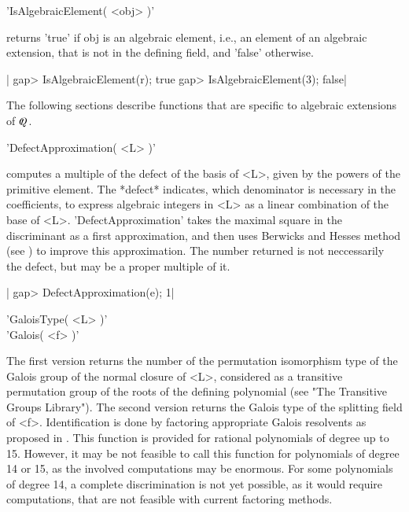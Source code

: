 
'IsAlgebraicElement( <obj> )'

returns 'true' if obj is an algebraic element, i.e., an element of an
algebraic extension, that is not in the defining field, and 'false'
otherwise.

|    gap> IsAlgebraicElement(r);
    true
    gap> IsAlgebraicElement(3);
    false|


The following sections describe functions that are specific to algebraic
extensions of ${Q\mskip-11mu\prime\,\,}$.


'DefectApproximation( <L> )'

computes a multiple of the defect of the basis of <L>, given by the
powers of the primitive element.  The *defect* indicates, which
denominator is necessary in the coefficients, to express algebraic
integers in <L> as a linear combination of the base of <L>.
'DefectApproximation' takes the maximal square in the discriminant as a
first approximation, and then uses Berwicks and Hesses method (see
\cite{Bra89}) to improve this approximation.  The number returned is not
neccessarily the defect, but may be a proper multiple of it.

|    gap> DefectApproximation(e);
    1|


'GaloisType( <L> )' \\
'Galois( <f> )'

The first version returns the number of the permutation isomorphism type
of the Galois group of the normal closure of <L>, considered as a
transitive permutation group of the roots of the defining polynomial (see
"The Transitive Groups Library").  The second version returns the Galois
type of the splitting field of <f>.  Identification is done by factoring
appropriate Galois resolvents as proposed in \cite{MS85}.  This function
is provided for rational polynomials of degree up to 15.  However, it may
be not feasible to call this function for polynomials of degree 14 or 15,
as the involved computations may be enormous.  For some polynomials of
degree 14, a complete discrimination is not yet possible, as it would
require computations, that are not feasible with current factoring
methods.

